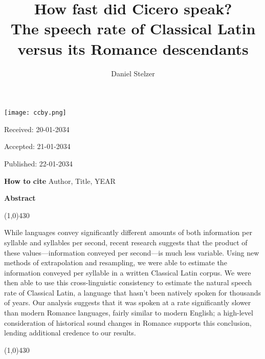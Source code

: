 \documentclass[12pt,twoside]{article}
\title{{\Huge{}How fast did Cicero speak?}\\{\Large{}The speech rate of Classical Latin versus its Romance descendants}}
\author{Daniel Stelzer}
\affil{University of Illinois at Urbana-Champaign\\stelzer3@illinois.edu}
\date{}
\makeatletter
\newcommand*{\tocref}[1]{\hyperref[{#1}]{\ref*{#1}.~\nameref*{#1}}}
\def\maketitle{{%
		\renewenvironment{tabular}[2][]
		{\begin{flushleft}}
			{\end{flushleft}}
		\AB@maketitle}}
\makeatother
\begin{document}
\maketitle

\thispagestyle{first}

\vspace{0.5cm}
\noindent \texttt{[image: ccby.png]}

\hfill Received: 20-01-2034 

\hfill Accepted: 21-01-2034

\hfill Published: 22-01-2034

\vspace{1cm}

\noindent \textbf{How to cite} Author, Title, YEAR

\vspace{1.5cm}

\noindent \textbf{Abstract}
\begin{center}
 	\line(1,0){430}
\end{center}
\vspace{-0,3cm}
\noindent While languages convey significantly different amounts of both information per syllable and syllables per second, recent research suggests that the product of these values---information conveyed per second---is much less variable. Using new methods of extrapolation and resampling, we were able to estimate the information conveyed per syllable in a written Classical Latin corpus. We were then able to use this cross-linguistic consistency to estimate the natural speech rate of Classical Latin, a language that hasn't been natively spoken for thousands of years. Our analysis suggests that it was spoken at a rate significantly slower than modern Romance languages, fairly similar to modern English; a high-level consideration of historical sound changes in Romance supports this conclusion, lending additional credence to our results. \\
\vspace{-0,4cm}
\begin{center}
	\line(1,0){430}
\end{center}


\end{document}

